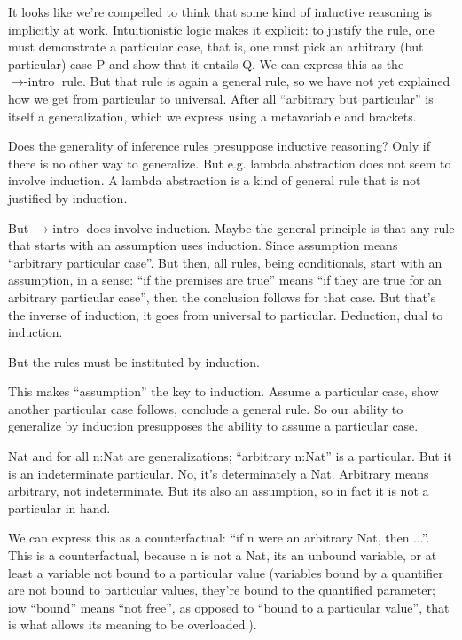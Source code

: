 It looks like we're compelled to think that some kind of inductive
reasoning is implicitly at work. Intuitionistic logic makes it
explicit: to justify the rule, one must demonstrate a particular case,
that is, one must pick an arbitrary (but particular) case P and show
that it entails Q. We can express this as the
\(\rightarrow\scriptstyle{\text{-intro}}\) rule. But that rule is
again a general rule, so we have not yet explained how we get from
particular to universal. After all ``arbitrary but particular'' is
itself a generalization, which we express using a metavariable and
brackets.

Does the generality of inference rules presuppose inductive reasoning?
Only if there is no other way to generalize. But e.g. lambda
abstraction does not seem to involve induction. A lambda abstraction
is a kind of general rule that is not justified by induction.

But \(\rightarrow\scriptstyle{\text{-intro}}\) does involve induction.
Maybe the general principle is that any rule that starts with an
assumption uses induction. Since assumption means ``arbitrary
particular case''. But then, all rules, being conditionals, start with
an assumption, in a sense: ``if the premises are true'' means ``if
they are true for an arbitrary particular case'', then the conclusion
follows for that case. But that's the inverse of induction, it goes
from universal to particular. Deduction, dual to induction.

But the rules must be instituted by induction.

This makes ``assumption'' the key to induction. Assume a particular
case, show another particular case follows, conclude a general rule.
So our ability to generalize by induction presupposes the ability to
assume a particular case.

Nat and for all n:Nat are generalizations; ``arbitrary n:Nat'' is a
particular. But it is an indeterminate particular. No, it's
determinately a Nat. Arbitrary means arbitrary, not indeterminate. But
its also an assumption, so in fact it is not a particular in hand.

We can express this as a counterfactual: ``if n were an arbitrary Nat,
then ...''. This is a counterfactual, because n is not a Nat, its an
unbound variable, or at least a variable not bound to a particular
value (variables bound by a quantifier are not bound to particular
values, they're bound to the quantified parameter; iow ``bound'' means
``not free'', as opposed to ``bound to a particular value'', that is
what allows its meaning to be overloaded.).

